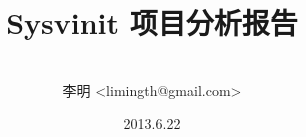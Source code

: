 \documentclass[12pt, a4paper]{book}
\begin{document}
\title{Sysvinit 项目分析报告}
\author{\\李明 <limingth@gmail.com>}
\date{2013.6.22}
\maketitle
\tableofcontents


\end{document}
